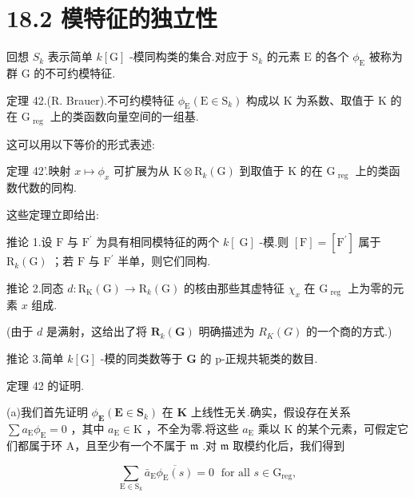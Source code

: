 \documentclass[10pt]{article}
\begin{document}
\section*{18.2 模特征的独立性}

回想 \({S}_{k}\) 表示简单 \(k\left\lbrack  \mathrm{G}\right\rbrack\) -模同构类的集合.对应于 \({\mathrm{S}}_{k}\) 的元素 \(\mathrm{E}\) 的各个 \({\phi }_{\mathrm{E}}\) 被称为群 \(\mathrm{G}\) 的不可约模特征.

定理 42.(R. Brauer).不可约模特征 \({\phi }_{\mathrm{E}}\left( {\mathrm{E} \in  {\mathrm{S}}_{k}}\right)\) 构成以 \(\mathrm{K}\) 为系数、取值于 K 的在 \({\mathrm{G}}_{\text{ reg }}\) 上的类函数向量空间的一组基.

这可以用以下等价的形式表述:

定理 42’.映射 \(x \mapsto  {\phi }_{x}\) 可扩展为从 \(\mathrm{K} \otimes  {\mathrm{R}}_{k}\left( \mathrm{G}\right)\) 到取值于 \(\mathrm{K}\) 的在 \({\mathrm{G}}_{\text{ reg }}\) 上的类函数代数的同构.

这些定理立即给出:

推论 1.设 \(\mathrm{F}\) 与 \({\mathrm{F}}^{\prime }\) 为具有相同模特征的两个 \(k\left\lbrack  \mathrm{\;G}\right\rbrack\) -模.则 \(\left\lbrack  \mathrm{F}\right\rbrack   = \left\lbrack  {\mathrm{F}}^{\prime }\right\rbrack\) 属于 \({\mathrm{R}}_{k}\left( \mathrm{G}\right)\) ；若 \(\mathrm{F}\) 与 \({\mathrm{F}}^{\prime }\) 半单，则它们同构.

推论 2.同态 \(d : {\mathrm{R}}_{\mathrm{K}}\left( \mathrm{G}\right)  \rightarrow  {\mathrm{R}}_{k}\left( \mathrm{G}\right)\) 的核由那些其虚特征 \({\chi }_{x}\) 在 \({\mathrm{G}}_{\text{ reg }}\) 上为零的元素 \(x\) 组成.

(由于 \(d\) 是满射，这给出了将 \({\mathbf{R}}_{k}\left( \mathbf{G}\right)\) 明确描述为 \({R}_{K}\left( G\right)\) 的一个商的方式.)

推论 3.简单 \(k\left\lbrack  \mathrm{G}\right\rbrack\) -模的同类数等于 \(\mathbf{G}\) 的 p-正规共轭类的数目.

定理 42 的证明.

(a)我们首先证明 \({\phi }_{\mathbf{E}}\left( {\mathbf{E} \in  {\mathbf{S}}_{k}}\right)\) 在 \(\mathbf{K}\) 上线性无关.确实，假设存在关系 \(\sum {a}_{\mathrm{E}}{\phi }_{\mathrm{E}} = 0\) ，其中 \({a}_{\mathrm{E}} \in  \mathrm{K}\) ，不全为零.将这些 \({a}_{\mathrm{E}}\) 乘以 \(\mathrm{K}\) 的某个元素，可假定它们都属于环 A，且至少有一个不属于 \(\mathfrak{m}\) .对 \(\mathfrak{m}\) 取模约化后，我们得到

\[
\mathop{\sum }\limits_{{\mathrm{E} \in  {\mathrm{S}}_{k}}}{\bar{a}}_{\mathrm{E}}\overline{{\phi }_{\mathrm{E}}\left( s\right) } = 0\;\text{ for all }s \in  {\mathrm{G}}_{\mathrm{{reg}}},
\]
\end{document}
